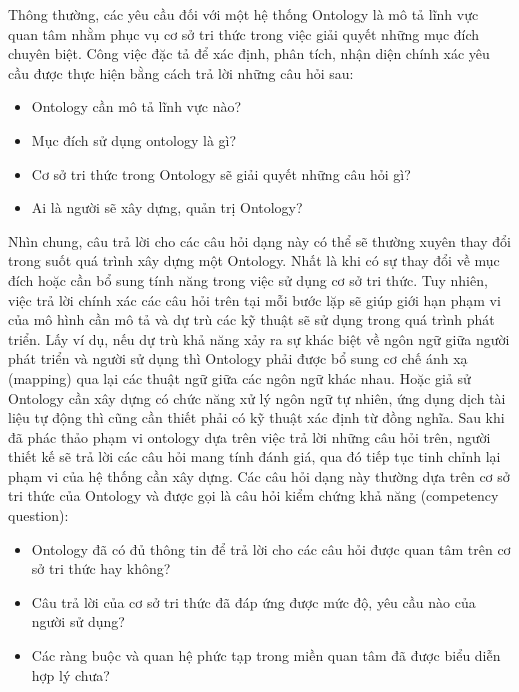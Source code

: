 Thông thường, các yêu cầu đối với một hệ thống Ontology là mô tả lĩnh vực quan tâm nhằm phục vụ cơ sở tri thức trong việc giải quyết những mục đích chuyên biệt. Công việc đặc tả để xác định, phân tích, nhận diện chính xác yêu cầu được thực hiện bằng cách trả lời những câu hỏi sau:
\begin{itemize}
	\item Ontology cần mô tả lĩnh vực nào?
	\item Mục đích sử dụng ontology là gì?
	\item Cơ sở tri thức trong Ontology sẽ giải quyết những câu hỏi gì?
	\item Ai là người sẽ xây dựng, quản trị Ontology?
\end{itemize}
Nhìn chung, câu trả lời cho các câu hỏi dạng này có thể sẽ thường xuyên thay đổi trong suốt quá trình xây dựng một Ontology. Nhất là khi có sự thay đổi về mục đích hoặc cần bổ sung tính năng trong việc sử dụng cơ sở tri thức. Tuy nhiên, việc trả lời chính xác các câu hỏi trên tại mỗi bước lặp sẽ giúp giới hạn phạm vi của mô hình cần mô tả và dự trù các kỹ thuật sẽ sử dụng trong quá trình phát triển. Lấy ví dụ, nếu dự trù khả năng xảy ra sự khác biệt về ngôn ngữ giữa người phát triển và người sử dụng thì Ontology phải được bổ sung cơ chế ánh xạ (mapping) qua lại các thuật ngữ giữa các ngôn ngữ khác nhau. Hoặc giả sử Ontology cần xây dựng có chức năng xử lý ngôn ngữ tự nhiên, ứng dụng dịch tài liệu tự động thì cũng cần thiết phải có kỹ thuật xác định từ đồng nghĩa. Sau khi đã phác thảo phạm vi ontology dựa trên việc trả lời những câu hỏi trên, người thiết kế sẽ trả lời các câu hỏi mang tính đánh giá, qua đó tiếp tục tinh chỉnh lại phạm vi của hệ thống cần xây dựng. Các câu hỏi dạng này thường dựa trên cơ sở tri thức của Ontology và được gọi là câu hỏi kiểm chứng khả năng (competency question):
\begin{itemize}
	\item Ontology đã có đủ thông tin để trả lời cho các câu hỏi được quan tâm trên cơ sở tri thức hay không?
	\item Câu trả lời của cơ sở tri thức đã đáp ứng được mức độ, yêu cầu nào của người sử dụng?
	\item Các ràng buộc và quan hệ phức tạp trong miền quan tâm đã được biểu diễn hợp lý chưa? 
\end{itemize}

